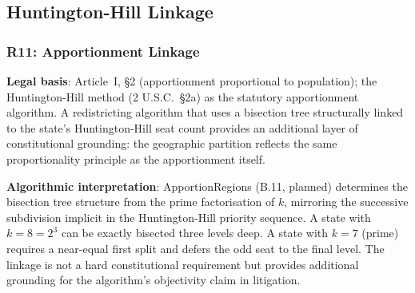 \subsection{Huntington-Hill Linkage}

\subsubsection*{R11: Apportionment Linkage}

\textbf{Legal basis}: Article~I, \S2 (apportionment proportional to population);
the Huntington-Hill method (2 U.S.C.\ \S2a) as the statutory apportionment
algorithm.
A redistricting algorithm that uses a bisection tree structurally linked to the
state's Huntington-Hill seat count provides an additional layer of constitutional
grounding: the geographic partition reflects the same proportionality principle
as the apportionment itself.

\textbf{Algorithmic interpretation}: ApportionRegions (B.11, planned) determines
the bisection tree structure from the prime factorisation of $k$, mirroring the
successive subdivision implicit in the Huntington-Hill priority sequence.
A state with $k = 8 = 2^3$ can be exactly bisected three levels deep.
A state with $k = 7$ (prime) requires a near-equal first split and defers the
odd seat to the final level.
The linkage is not a hard constitutional requirement but provides additional
grounding for the algorithm's objectivity claim in litigation.
